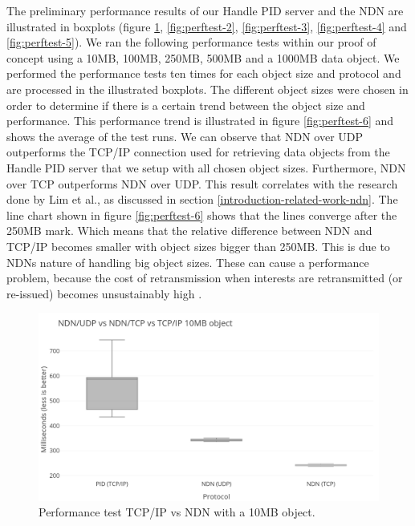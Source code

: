 The preliminary performance results of our Handle PID server and the NDN are illustrated in boxplots (figure \ref{fig:perftest-1}, \ref{fig:perftest-2}, \ref{fig:perftest-3}, \ref{fig:perftest-4} and \ref{fig:perftest-5}). We ran the following performance tests within our proof of concept using a 10MB, 100MB, 250MB, 500MB and a 1000MB data object. We performed the performance tests ten times for each object size and protocol and are processed in the illustrated boxplots. The different object sizes were chosen in order to determine if there is a certain trend between the object size and performance. This performance trend is illustrated in figure \ref{fig:perftest-6} and shows the average of the test runs. We can observe that NDN over UDP outperforms the TCP/IP connection used for retrieving data objects from the Handle PID server that we setup with all chosen object sizes. Furthermore, NDN over TCP outperforms NDN over UDP. This result correlates with the research done by Lim et al., as discussed in section \ref{introduction-related-work-ndn}. The line chart shown in figure \ref{fig:perftest-6} shows that the lines converge after the 250MB mark. Which means that the relative difference between NDN and TCP/IP becomes smaller with object sizes bigger than 250MB. This is due to NDNs nature of handling big object sizes. These can cause a performance problem, because the cost of retransmission when interests are retransmitted (or re-issued) becomes unsustainably high \cite{ndn-objects}. %

\begin{figure}[H]
\centering
\includegraphics[scale=0.43]{Images/bench10MB_grey.png}
\caption{Performance test TCP/IP vs NDN with a 10MB object.}
\label{fig:perftest-1}
\end{figure}

